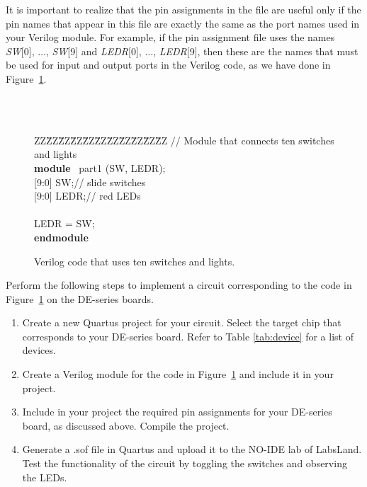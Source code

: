 \documentclass[epsfig,10pt,fullpage]{article}
\begin{document}
It is important to realize that the pin assignments in the
file are useful only if the pin names that appear in this file
are exactly the same as the port names used in your Verilog module.
For example, if the pin assignment file uses the names {\it SW}[0], $\ldots$, {\it SW}[9] 
and {\it LEDR}[0], $\ldots$, {\it LEDR}[9], then these are the names that must be used
for input and output ports in the Verilog code, as we have done in Figure~\ref{fig:1}.

~\\
~\\
\begin{figure}[H]
\begin{center}
\begin{minipage}[t]{12.5 cm}
\begin{tabbing}
ZZ\=ZZ\=ZZ\=ZZ\=ZZ\=ZZ\=ZZ\=ZZ\=ZZ\=ZZ\=ZZ\kill
// Module that connects ten switches and lights\\
{\bf module} ~part1 (SW, LEDR);\\
 [9:0] SW;\>\>\>\>\>\>\>\>// slide switches\\
 [9:0] LEDR;\>\>\>\>\>\>\>\>// red LEDs\\
~\\
 LEDR = SW;\\
{\bf endmodule}
\end{tabbing}
\end{minipage}
	\caption{Verilog code that uses ten switches and lights.}
	\label {fig:1}
\end{center}
\end{figure}

\newpage
Perform the following steps to implement a circuit corresponding to the code
in  Figure~\ref{fig:1} on the DE-series boards.
\begin{enumerate}
\item Create a new Quartus project for your circuit. Select the target chip that corresponds to your DE-series board.
Refer to Table \ref{tab:device} for a list of devices.
\item Create a Verilog module for the code in  Figure~\ref{fig:1} and include it in your project.
\item Include in your project the required pin assignments for your DE-series board, as discussed
above. Compile the project.
\item Generate a .sof file in Quartus and upload it to the NO-IDE lab of LabsLand. Test the functionality of the 
circuit by toggling the switches and observing the LEDs.
\end{enumerate}
\end{document}
